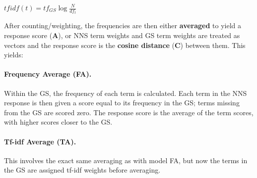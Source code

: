 \documentclass[11pt,letterpaper]{article}
\begin{document}
\begin{exe}
  \ex\label{ex:tfidf} $tfidf(t) = tf_{GS} \log \frac{N}{df_{t}}$
\end{exe}


After counting/weighting, the frequencies are then either
\textbf{averaged} to yield a response score (\textbf{A}), or NNS term
weights and GS term weights are treated as vectors and the response
score is the \textbf{cosine distance} (\textbf{C}) between them.  This
yields:

\paragraph{Frequency Average (FA).} 
Within the GS, the frequency of each term is calculated. Each term in
the NNS response is then given a score equal to its frequency in the
GS; terms missing from the GS are scored zero. The response score is
the average of the term scores, with higher scores closer to the GS.

\paragraph{Tf-idf Average (TA).} This involves the exact same
averaging as with model FA, but now the terms in the GS are assigned
tf-idf weights before averaging.
\end{document}
